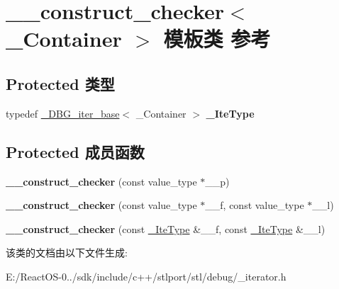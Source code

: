 \hypertarget{class____construct__checker}{}\section{\+\_\+\+\_\+construct\+\_\+checker$<$ \+\_\+\+Container $>$ 模板类 参考}
\label{class____construct__checker}
\subsection*{Protected 类型}
\begin{DoxyCompactItemize}
\item 
\mbox{\label{class____construct__checker_a15b4e06c30be76b73f9be77698249d13}} 
typedef \hyperlink{struct___d_b_g__iter__base}{\+\_\+\+D\+B\+G\+\_\+iter\+\_\+base}$<$ \+\_\+\+Container $>$ {\bfseries \+\_\+\+Ite\+Type}
\end{DoxyCompactItemize}
\subsection*{Protected 成员函数}
\begin{DoxyCompactItemize}
\item 
\mbox{\label{class____construct__checker_a71bc88604f96018ed6fb67b2f06471b3}} 
{\bfseries \+\_\+\+\_\+construct\+\_\+checker} (const value\+\_\+type $\ast$\+\_\+\+\_\+p)
\item 
\mbox{\label{class____construct__checker_a823c981eb00b15e88c175ebec850c3b1}} 
{\bfseries \+\_\+\+\_\+construct\+\_\+checker} (const value\+\_\+type $\ast$\+\_\+\+\_\+f, const value\+\_\+type $\ast$\+\_\+\+\_\+l)
\item 
\mbox{\label{class____construct__checker_aef622d01c1f0848e0e01438037cd7e6f}} 
{\bfseries \+\_\+\+\_\+construct\+\_\+checker} (const \hyperlink{struct___d_b_g__iter__base}{\+\_\+\+Ite\+Type} \&\+\_\+\+\_\+f, const \hyperlink{struct___d_b_g__iter__base}{\+\_\+\+Ite\+Type} \&\+\_\+\+\_\+l)
\end{DoxyCompactItemize}


该类的文档由以下文件生成\+:\begin{DoxyCompactItemize}
\item 
E\+:/\+React\+O\+S-\/0../sdk/include/c++/stlport/stl/debug/\+\_\+iterator.\+h\end{DoxyCompactItemize}
